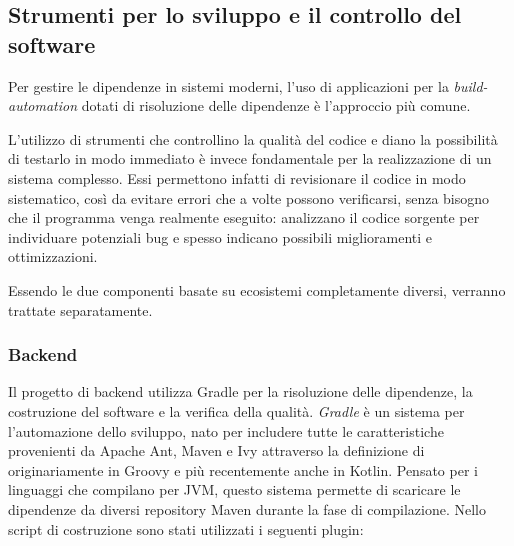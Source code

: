   \subsection{Strumenti per lo sviluppo e il controllo del software}\label{subec:quality}
    Per gestire le dipendenze in sistemi moderni, l'uso di applicazioni per la \emph{build-automation} dotati di risoluzione delle dipendenze è l'approccio più comune.

    L'utilizzo di strumenti che controllino la qualità del codice e diano la possibilità di testarlo in modo immediato è invece fondamentale per la realizzazione di un sistema complesso.
    Essi permettono infatti di revisionare il codice in modo sistematico, così da evitare errori che a volte possono verificarsi, senza bisogno che il programma venga realmente eseguito:
    analizzano il codice sorgente per individuare potenziali bug e spesso indicano possibili miglioramenti e ottimizzazioni.

    Essendo le due componenti basate su ecosistemi completamente diversi, verranno trattate separatamente.

    \subsubsection{Backend}

      Il progetto di backend utilizza Gradle per la risoluzione delle dipendenze, la costruzione del software e la verifica della qualità.
      \emph{Gradle} è un sistema per l'automazione dello sviluppo, nato per includere tutte le caratteristiche provenienti da Apache Ant, Maven e Ivy attraverso la definizione di  originariamente in Groovy e più recentemente anche in Kotlin.
      Pensato per i linguaggi che compilano per JVM, questo sistema permette di scaricare le dipendenze da diversi repository Maven durante la fase di compilazione.
      Nello script di costruzione sono stati utilizzati i seguenti plugin:

